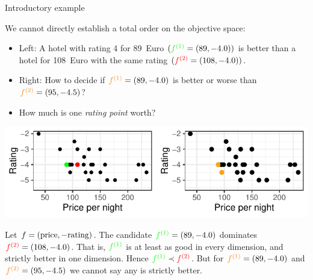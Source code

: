\documentclass[11pt,compress,t,notes=noshow,xcolor=table]{beamer}
\begin{document}
\begin{vbframe}{Introductory example}
\framebreak

{\footnotesize
We cannot directly establish a total order on the objective space:
\begin{itemize}
  \item Left: A hotel with rating 4 for 89~Euro 
        \((\textcolor{green}{f^{(1)}} = (89, -4.0))\) 
        is better than a hotel for 108~Euro with the same rating
        \((\textcolor{red}{f^{(2)}} = (108, -4.0))\).
  \item Right: How to decide if 
        \(\textcolor{orange}{f^{(1)}}=(89, -4.0)\) is better or worse than 
        \(\textcolor{orange}{f^{(2)}}=(95, -4.5)\)?
  \item How much is one \emph{rating point} worth?
\end{itemize}

\begin{center}
\includegraphics[scale=1]{slides/11-multicrit/figure_man/expedia-2-1.pdf}
\end{center}

\vspace{-0.1cm}

Let \(f = (\text{price}, -\text{rating})\). The candidate 
\(\textcolor{green}{f^{(1)}}=(89,-4.0)\)
dominates 
\(\textcolor{red}{f^{(2)}}=(108,-4.0)\). 
That is, \(\textcolor{green}{f^{(1)}}\) is at least as good 
in every dimension, and strictly better in one dimension.
Hence $\textcolor{green}{f^{(1)}} \prec \textcolor{red}{f^{(2)}}$. But for
\(\textcolor{orange}{f^{(1)}}=(89,-4.0)\) and \(\textcolor{orange}{f^{(2)}}=(95,-4.5)\)
we cannot say any is strictly better.


}


\end{vbframe}
\end{document}
